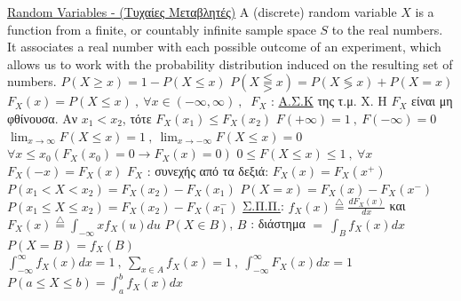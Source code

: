 \documentclass[12pt]{article}
\begin{document}
\begin{flushleft}
	\uline{Random Variables - (\textgreek{Τυχαίες Μεταβλητές})} \linebreak 
	A (discrete) random variable $X$ is a function from a finite, or countably infinite sample space $S$ to the real numbers. It associates a real number with each possible outcome of an experiment, which allows us to work with the probability distribution induced on the resulting set of numbers. \linebreak 
	\textbullet \quad $P(X \geq x) = 1 - P(X \leq x) $ \linebreak 
	\textbullet \quad $P(X \lesseqqgtr x) = P(X \lessgtr x) + P(X = x) $ \linebreak 
	\textbullet \quad $F_X (x) = P(X \leq x)\ , \ \forall x \in (-\infty , \infty) \ , \ $ $F_X$  :  \uline{\textgreek{Α.Σ.Κ}} \textgreek{της τ.μ. Χ.} \linebreak 
	\textbullet \quad \textgreek{Η} $F_X$ \textgreek{είναι μη φθίνουσα. Αν} $x_1 < x_2$, \textgreek{τότε} $F_X(x_1) \leq F_X(x_2)$ \linebreak 
	\textbullet \quad $F(+ \infty) = 1 \ , \ F(-\infty) = 0$ \linebreak 
	\textbullet \quad $\lim_{x\to \infty} F(X \leq x) = 1 \ , \ \lim_{x \to -\infty} F(X \leq x) = 0 $ \linebreak 
	\textbullet \quad $\forall x \leq x_0 (F_X (x_0) = 0 \rightarrow F_X (x) = 0 ) $ \linebreak 
	\textbullet \quad $0 \leq F(X \leq x) \leq 1\ , \ \forall x $ \linebreak 
	\textbullet \quad $F_X (-x) = F_X (x) $ \linebreak 
	\textbullet \quad $F_X$  :  \textgreek{συνεχής από τα δεξιά}: $F_X(x) = F_X(x^+)$ \linebreak 
	\textbullet \quad $P(x_1 < X < x_2) = F_X(x_2) - F_X(x_1)$ \linebreak 
	\textbullet \quad $P(X = x) = F_X(x) -F_X(x^-) $ \linebreak 
	\textbullet \quad $P(x_1 \leq X \leq x_2) = F_X (x_2) - F_X(x_1^-)$ \linebreak 
	\textbullet \quad \textgreek{\uline{Σ.Π.Π.}}: $\displaystyle f_X(x) \overset{\triangle}{=} \frac{dF_X(x)}{dx} $ \textgreek{και} $\displaystyle F_X(x) \overset{\triangle}{=} \int_{-\infty}{x} f_X (u) du $ \linebreak 
	\textbullet \quad $P(X \in B)$, $B$  :  \textgreek{διάστημα} $ = \ \int_B f_X(x) dx$ \linebreak 
	\textbullet \quad $P(X=B) = f_X(B) $ \linebreak 
	\textbullet \quad $\int_{-\infty}^{\infty} f_X(x) dx = 1\ , \ \sum \limits_{x\in A} f_X(x) = 1 \ , \ \int_{-\infty}^{\infty} F_X(x) dx = 1$ \linebreak 
	\textbullet \quad $P(a\leq X \leq b) = \int_a^b f_X(x) dx$ \linebreak 
	

\end{flushleft}
\end{document}
